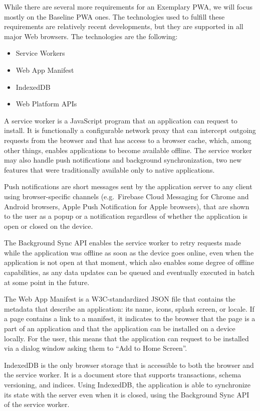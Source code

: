 \documentclass[english,zadani,odsaz]{fitthesis}
\begin{document}
While there are several more requirements for an Exemplary PWA, we will focus
mostly on the Baseline PWA ones. The technologies used to fulfill these
requirements are relatively recent developments, but they are supported in all
major Web browsers. The technologies are the following:

\begin{itemize}
\item Service Workers
\item Web App Manifest
\item IndexedDB
\item Web Platform APIs
\end{itemize}

A service worker is a JavaScript program that an application can request to
install. It is functionally a configurable network proxy \cite{mdn_svcwrk} that can
intercept outgoing requests from the browser and that has access to a browser
cache, which, among other things, enables applications to become available
offline. The service worker may also handle push notifications and background
synchronization, two new features that were traditionally available only to
native applications.

Push notifications are short messages sent by the application server to any
client using browser-specific channels (e.g.~Firebase Cloud Messaging for
Chrome and Android browsers, Apple Push Notification for Apple browsers), that
are shown to the user as a popup or a notification regardless of whether the
application is open or closed on the device.

The Background Sync API enables the service worker to retry requests made while
the application was offline as soon as the device goes online, even when the
application is not open at that moment, which also enables some degree of
offline capabilities, as any data updates can be queued and eventually executed in
batch at some point in the future.

The Web App Manifest is a W3C-standardized JSON file \cite{webapp-manifest} that
contains the metadata that describe an application: its name, icons, splash
screen, or locale. If a page contains a link to a manifest, it indicates to the
browser that the page is a part of an application and that the application can
be installed on a device locally. For the user, this means that the application
can request to be installed via a dialog window asking them to ``Add to Home
Screen''.

IndexedDB is the only browser storage that is accessible to both the browser and
the service worker. It is a document store that supports transactions, schema
versioning, and indices. Using IndexedDB, the application is able to synchronize
its state with the server even when it is closed, using the Background Sync API
of the service worker.
\end{document}
